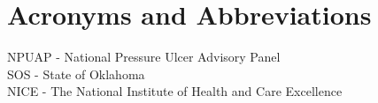 \chapter*{Acronyms and Abbreviations}

\vspace{5mm}
NPUAP - National Pressure Ulcer Advisory Panel\\
SOS - State of Oklahoma\\
NICE - The National Institute of Health and Care Excellence\\



